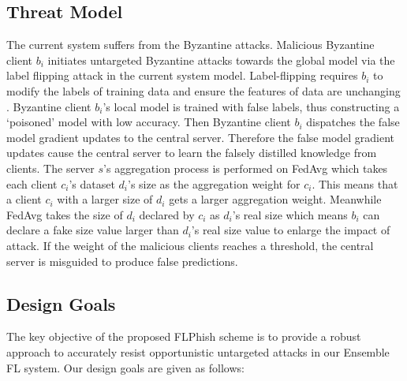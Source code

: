 \documentclass[journal]{IEEEtran}
\begin{document}
\subsection{Threat Model}
The current system suffers from the Byzantine attacks. Malicious Byzantine client $b_{i}$ initiates untargeted Byzantine attacks towards the global model via the label flipping attack in the current system model. Label-flipping requires $b_{i}$ to modify the labels of training data and ensure the features of data are unchanging \cite{ref_18_label_flipping}. Byzantine client $b_{i}$'s local model is trained with false labels, thus constructing a `poisoned' model with low accuracy. Then Byzantine client $b_{i}$ dispatches the false model gradient updates to the central server. Therefore the false model gradient updates cause the central server to learn the falsely distilled knowledge from clients. The server $s$'s aggregation process is performed on FedAvg which takes each client $c_{i}$'s dataset $d_{i}$'s size as the aggregation weight for $c_{i}$. This means that a client $c_{i}$ with a larger size of $d_{i}$ gets a larger aggregation weight. Meanwhile FedAvg takes the size of $d_{i}$ declared by $c_{i}$ as $d_{i}$'s real size which means $b_{i}$ can declare a fake size value larger than $d_{i}$'s real size value to enlarge the impact of attack. If the weight of the malicious clients reaches a threshold, the central server is misguided to produce false predictions.


\subsection{Design Goals}
The key objective of the proposed FLPhish scheme is to provide a robust approach to accurately resist opportunistic untargeted attacks in our Ensemble FL system. Our design goals are given as follows:
\end{document}
